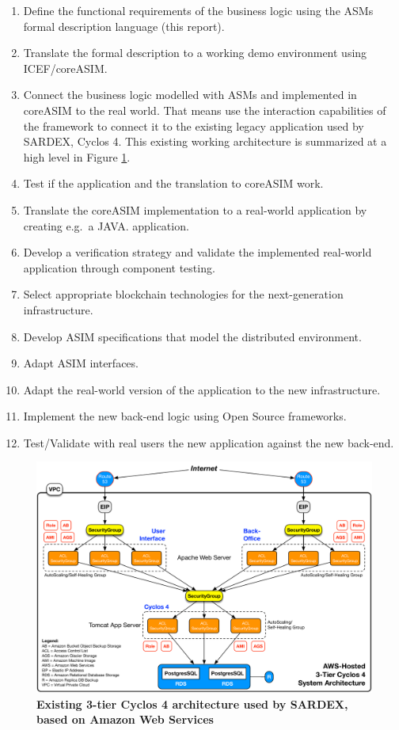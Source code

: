 \begin{enumerate}
	\item Define the functional requirements of the business logic using the ASMs formal description language (this report).
	\item Translate the formal description to a working demo environment using ICEF/coreASIM.
	\item Connect the business logic modelled with ASMs and implemented in coreASIM to the real world. That means use the interaction capabilities of the framework to connect it to the existing legacy application used by SARDEX, Cyclos 4. This existing working architecture is summarized at a high level in Figure \ref{cyclosarchitecture}.
	\item Test if the application and the translation to coreASIM work.
	\item Translate the coreASIM implementation to a real-world application by creating e.g.\ a JAVA. application.
	\item Develop a verification strategy and validate the implemented real-world application through component testing.
	\item Select appropriate blockchain technologies for the next-generation infrastructure.
	\item Develop ASIM specifications that model the distributed environment.
	\item Adapt ASIM interfaces.
	\item Adapt the real-world version of the application to the new infrastructure.
	\item Implement the new back-end logic using Open Source frameworks.
	\item Test/Validate with real users the new application against the new back-end.
\end{enumerate}


\begin{figure}[htbp]
\centering
\includegraphics[width=17.5cm]{Figures/3-Tier_Cyclos_Architecture}
\caption{\small\textbf{Existing 3-tier Cyclos 4 architecture used by SARDEX, based on Amazon Web Services}}
\label{cyclosarchitecture}
\end{figure}




